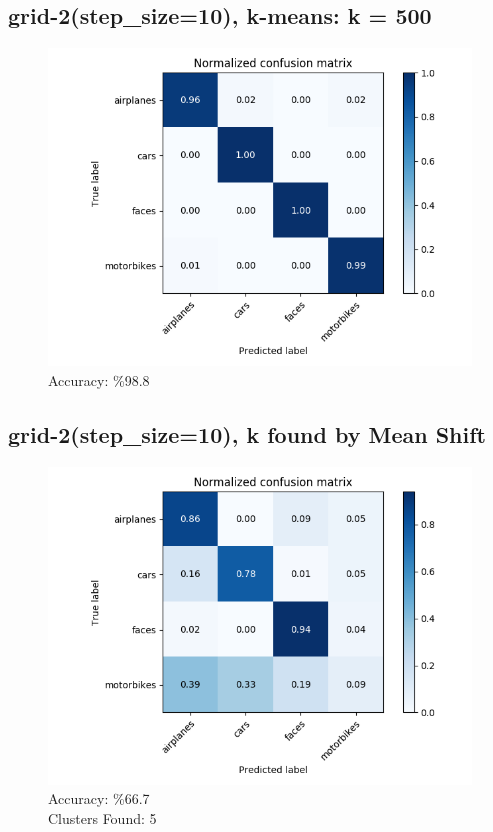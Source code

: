 \subsection*{grid-2(step\_size=10), k-means: k = 500}
\begin{figure}[H]
    \centering
    \includegraphics[scale = 0.45]{images/confusion-stp-10-500.png}
    \caption*{Accuracy: \%98.8}
\end{figure}

\subsection*{grid-2(step\_size=10), k found by Mean Shift}
\begin{figure}[H]
    \centering
    \includegraphics[scale = 0.45]{images/confusion-stp-10-meanshift.png}
    \caption*{Accuracy: \%66.7 \\
              Clusters Found: 5}
\end{figure}


